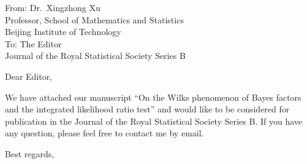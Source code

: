 \documentclass[11pt]{letter} %
\begin{document}
    \begin{letter}{From: Dr.\  Xingzhong Xu\\
        Professor, School of Mathematics and Statistics\\
        Beijing Institute of Technology\\
        \vspace{10pt}
        To: The  Editor\\
        Journal of the Royal Statistical Society Series B} 



        \signature{Xingzhong Xu\\
        Email address: xuxz@bit.edu.cn}


\opening{Dear Editor,}
We have attached our manuscript ``On the Wilks phenomenon of Bayes factors and the integrated likelihood ratio test'' and would like to be considered for publication in the Journal of the Royal Statistical Society Series B.
        If you have any question, please feel free to contact me by email.
\closing{Best regards,}
\end{letter}
\end{document}
